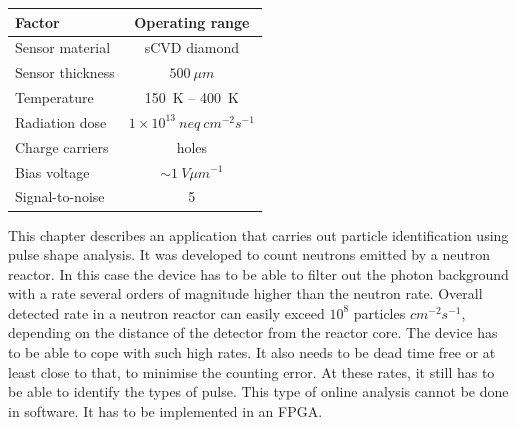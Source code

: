 \documentclass[12pt]{mytustyle}  %
\begin{document}

\begin{center}
\begin{tabular}{l*{1}{c}}
Factor              & Operating range \\
\hline
Sensor material & sCVD diamond \\
Sensor thickness & $500~\mu m$ \\
Temperature & 150~K -- 400~K \\
Radiation dose & $1\times10^{13}~neq~cm^{-2} s^{-1}$ \\
Charge carriers & holes \\
Bias voltage & $\sim1~V \mu m^{-1}$ \\
Signal-to-noise & 5 \\
\end{tabular}
\label{tab:limits}
\end{center}




This chapter describes an application that carries out particle identification using pulse shape analysis. It was developed to count neutrons emitted by a neutron reactor. In this case the device has to be able to filter out the photon background with a rate several orders of magnitude higher than the neutron rate. Overall detected rate in a neutron reactor can easily exceed $10^8$ particles $cm^{-2}s^{-1}$, depending on the distance of the detector from the reactor core. The device has to be able to cope with such high rates. It also needs to be dead time free or at least close to that, to minimise the counting error. At these rates, it still has to be able to identify the types of pulse. This type of online analysis cannot be done in software. It has to be implemented in an FPGA.
















\end{document}
